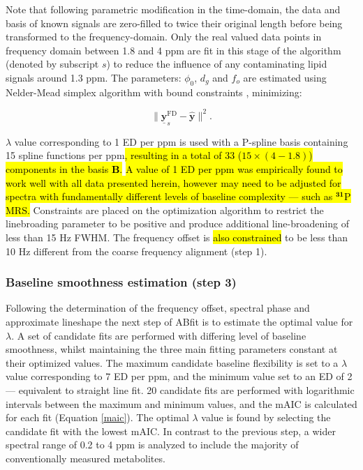 \documentclass[num-refs]{wiley-article}
\newcommand{\revone}[2]{\hl{#1}\marginnote{\hl{#2}}}
\begin{document}
Note that following parametric modification in the time-domain, the data and basis of known signals are zero-filled to twice their original length before being transformed to the frequency-domain. Only the real valued data points in frequency domain between 1.8 and 4 ppm are fit in this stage of the algorithm (denoted by subscript $s$) to reduce the influence of any contaminating lipid signals around 1.3 ppm. The parameters: $\phi_{0}$, $d_{g}$ and $f_{o}$ are estimated using Nelder-Mead simplex algorithm with bound constraints \cite{Box1965}, minimizing:

\begin{equation}
    \| \underline{\textbf{y}}^{\mathrm{FD}}_{s}  - \hat{\textbf{y}} \|^{2}.
  \label{obj_fn}
\end{equation}

 $\lambda$ value corresponding to 1 ED per ppm is used with a P-spline basis containing 15 spline functions per ppm\revone{, resulting in a total of 33 ($15 \times (4 - 1.8)$) components in the basis $\textbf{B}$.}{R1.19} \revone{A value of 1 ED per ppm was empirically found to work well with all data presented herein, however may need to be adjusted for spectra with fundamentally different levels of baseline complexity --- such as $^{\textbf{31}}$P MRS.}{R1.19} Constraints are placed on the optimization algorithm to restrict the linebroading parameter to be positive and produce additional line-broadening of less than 15 Hz FWHM. The frequency offset is \revone{also constrained}{R1.20} to be less than 10 Hz different from the coarse frequency alignment (step 1).

\subsubsection{Baseline smoothness estimation (step 3)}
Following the determination of the frequency offset, spectral phase and approximate lineshape the next step of ABfit is to estimate the optimal value for $\lambda$. A set of candidate fits are performed with differing level of baseline smoothness, whilst maintaining the three main fitting parameters constant at their optimized values. The maximum candidate baseline flexibility is set to a $\lambda$ value corresponding to 7 ED per ppm, and the minimum value set to an ED of 2 --- equivalent to straight line fit. 20 candidate fits are performed with logarithmic intervals between the maximum and minimum values, and the mAIC is calculated for each fit (Equation \ref{maic}). The optimal $\lambda$ value is found by selecting the candidate fit with the lowest mAIC. In contrast to the previous step, a wider spectral range of 0.2 to 4 ppm is analyzed to include the majority of conventionally measured metabolites.
\end{document}
